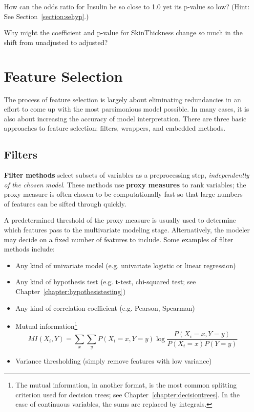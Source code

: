\begin{question}{}
How can the odds ratio for Insulin be so close to 1.0 yet its p-value so low? (Hint: See Section~\ref{section:sehyp}.)
\end{question}

\begin{question}{}
Why might the coefficient and p-value for SkinThickness change so much in the shift from unadjusted to adjusted? 
\end{question}



\section{Feature Selection}

The process of feature selection is largely about eliminating redundancies in an effort to come up with the most parsimonious model possible. In many cases, it is also about increasing the accuracy of model interpretation. There are three basic approaches to feature selection: filters, wrappers, and embedded methods. 

\subsection{Filters}

\textbf{Filter methods} select subsets of variables as a preprocessing step, \emph{independently of the chosen model}. These methods use \textbf{proxy measures} to rank variables; the proxy measure is often chosen to be computationally fast so that large numbers of features can be sifted through quickly.

A predetermined threshold of the proxy measure is usually used to determine which features pass to the multivariate modeling stage. Alternatively, the modeler may decide on a fixed number of features to include. Some examples of filter methods include:

\begin{itemize}
\item Any kind of univariate model (e.g. univariate logistic or linear regression)
\item Any kind of hypothesis test (e.g. t-test, chi-squared test; see Chapter~\ref{chapter:hypothesistesting})
\item Any kind of correlation coefficient (e.g. Pearson, Spearman)
\item Mutual information\footnote{The mutual information, in another format, is the most common splitting criterion used for decision trees; see Chapter~\ref{chapter:decisiontrees}. In the case of continuous variables, the sums are replaced by integrals.} 
$$ MI(X_i,Y) = \sum_x \sum_y P(X_i = x, Y = y) \log \frac{P(X_i = x, Y = y)}{P(X_i = x) P(Y = y)} $$
\item Variance thresholding (simply remove features with low variance)
\end{itemize}

